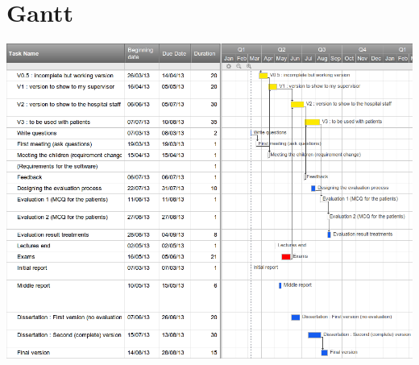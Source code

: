 \documentclass[12pt,MSc]{muthesis}
\begin{document}
    \chapter{Gantt}
    \label{chap:gantt}
\includegraphics[scale=0.5]{HAN.png}
\fi


    
    
\end{document}
